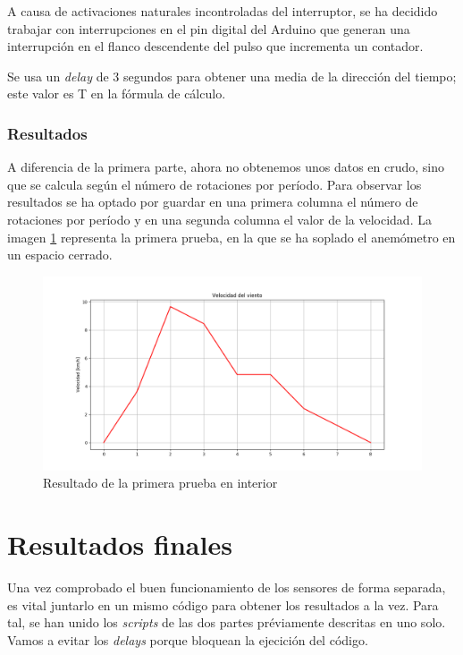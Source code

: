 \documentclass[a4paper, 11pt]{article}
\begin{document}
A causa de activaciones naturales incontroladas del interruptor, se ha decidido trabajar con interrupciones en el pin digital del Arduino que generan una interrupción en el flanco descendente del pulso que incrementa un contador.

Se usa un \textit{delay} de 3 segundos para obtener una media de la dirección del tiempo; este valor es T en la fórmula de cálculo. 

\subsubsection{Resultados}
A diferencia de la primera parte, ahora no obtenemos unos datos en crudo, sino que se calcula según el número de rotaciones por período. Para observar los resultados se ha optado por guardar en una primera columna el número de rotaciones por período y en una segunda columna el valor de la velocidad. La imagen \ref{fig:testvelocity1} representa la primera prueba, en la que se ha soplado el anemómetro en un espacio cerrado.

\begin{figure}[h]
	\center
	\includegraphics[width=1\textwidth]{img/testVelocityIn.png}
	\caption{Resultado de la primera prueba en interior}
	\label{fig:testvelocity1}
\end{figure}

\section{Resultados finales}
Una vez comprobado el buen funcionamiento de los sensores de forma separada, es vital juntarlo en un mismo código para obtener los resultados a la vez. Para tal, se han unido los \textit{scripts} de las dos partes préviamente descritas en uno solo. Vamos a evitar los \textit{delays} porque bloquean la ejecición del código.
\end{document}
